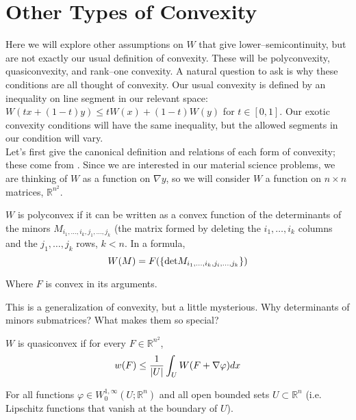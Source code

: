 \documentclass[../main.tex]{subfiles}
\begin{document}
\section{Other Types of Convexity}

Here we will explore other assumptions on $W$ that give lower--semicontinuity, but are not exactly our usual definition of convexity.
These will be polyconvexity, quasiconvexity, and rank--one convexity.
A natural question to ask is why these conditions are all thought of convexity.
Our usual convexity is defined by an inequality on line segment in our relevant space: $W(tx + (1-t)y) \leq t W(x) + (1-t) W(y)$ for $t \in [0,1]$.
Our exotic convexity conditions will have the same inequality, but the allowed segments in our condition will vary. \\

Let's first give the canonical definition and relations of each form of convexity; these come from \cite{dacorogna_direct_2008}.
Since we are interested in our material science problems, we are thinking of $W$ as a function on $\nabla y$, so we will consider $W$ a function on $n \times n$ matrices, $\mathbb{R}^{n^2}$.


\begin{defn}[Polyconvexity]
	$W$ is polyconvex if it can be written as a convex function of the determinants of the minors $M_{i_1, \ldots, i_k, j_1, \ldots, j_k}$ (the matrix formed by deleting the $i_1, \ldots, i_k$ columns and the $j_1, \ldots, j_k$ rows, $k < n$.
	In a formula,
	\begin{equation*}
		W(M) = F( \{\mathrm{det} M_{i_1, \ldots, i_k, j_i, \ldots, j_k}\} )
	\end{equation*}

	Where $F$ is convex in its arguments.
\end{defn}

This is a generalization of convexity, but a little mysterious.
Why determinants of minors submatrices?
What makes them so special?

\begin{defn}[Quasiconvexity]
	$W$ is quasiconvex if for every $F \in \mathbb{R}^{n^2}$,
	\begin{equation*}
		w(F) \leq \frac{1}{\lvert U\rvert} \int_U W(F + \nabla \varphi) dx
	\end{equation*}

	For all functions $\varphi \in W^{1,\infty}_0(U; \mathbb{R}^n)$ and all open bounded sets $U \subset \mathbb{R}^n$ (i.e. Lipschitz functions that vanish at the boundary of $U$).
\end{defn}
\end{document}
